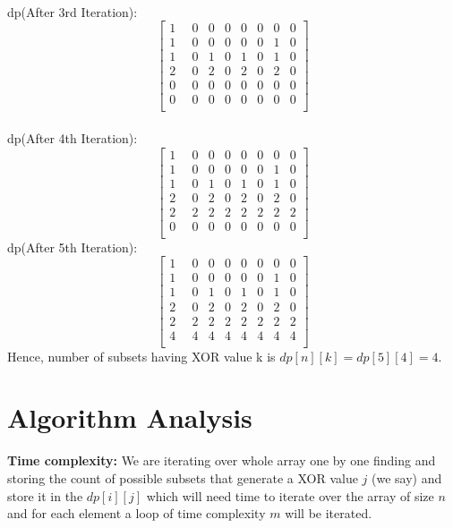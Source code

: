 \documentclass[conference]{IEEEtran}
\begin{document}
\\
dp(After 3rd Iteration):\\
$$
\begin{bmatrix}
1 & 0 & 0 & 0 & 0 & 0 & 0 & 0\\
1 & 0 & 0 & 0 & 0 & 0 & 1 & 0\\
1 & 0 & 1 & 0 & 1 & 0 & 1 & 0\\
2 & 0 & 2 & 0 & 2 & 0 & 2 & 0\\
0 & 0 & 0 & 0 & 0 & 0 & 0 & 0\\
0 & 0 & 0 & 0 & 0 & 0 & 0 & 0\\
\quad
\end{bmatrix}
$$
\\
dp(After 4th Iteration):\\
$$
\begin{bmatrix}
1 & 0 & 0 & 0 & 0 & 0 & 0 & 0\\
1 & 0 & 0 & 0 & 0 & 0 & 1 & 0\\
1 & 0 & 1 & 0 & 1 & 0 & 1 & 0\\
2 & 0 & 2 & 0 & 2 & 0 & 2 & 0\\
2 & 2 & 2 & 2 & 2 & 2 & 2 & 2\\
0 & 0 & 0 & 0 & 0 & 0 & 0 & 0\\
\quad
\end{bmatrix}
$$
dp(After 5th Iteration):\\
$$
\begin{bmatrix}
1 & 0 & 0 & 0 & 0 & 0 & 0 & 0\\
1 & 0 & 0 & 0 & 0 & 0 & 1 & 0\\
1 & 0 & 1 & 0 & 1 & 0 & 1 & 0\\
2 & 0 & 2 & 0 & 2 & 0 & 2 & 0\\
2 & 2 & 2 & 2 & 2 & 2 & 2 & 2\\
4 & 4 & 4 & 4 & 4 & 4 & 4 & 4\\
\quad
\end{bmatrix}
$$
Hence, number of subsets having XOR value k is   $dp[n][k]=dp[5][4]=4$.

\section{Algorithm Analysis}
\textbf{Time complexity:}
We are iterating over whole array one by one finding and storing the count of possible subsets that generate a XOR value $j$ (we say) and store it in the $dp[i][j]$ which will need time to iterate over the array of size $n$ and for each element a loop of time complexity $m$ will be iterated.\\
\end{document}
